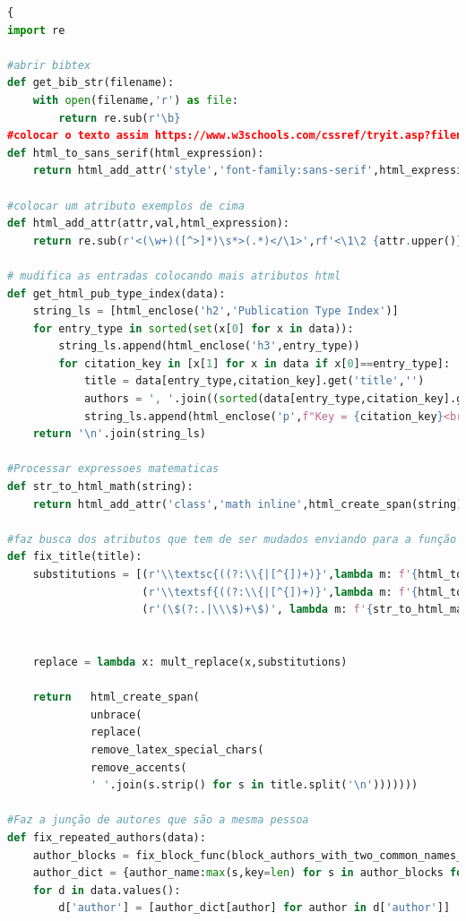 \documentclass[11pt,a4paper]{report}
\begin{document}
\begin{lstlisting}[language=python]{
import re

#abrir bibtex
def get_bib_str(filename):
    with open(filename,'r') as file:
        return re.sub(r'\b}
#colocar o texto assim https://www.w3schools.com/cssref/tryit.asp?filename=trycss_font-family
def html_to_sans_serif(html_expression):
    return html_add_attr('style','font-family:sans-serif',html_expression)

#colocar um atributo exemplos de cima
def html_add_attr(attr,val,html_expression):
    return re.sub(r'<(\w+)([^>]*)\s*>(.*)</\1>',rf'<\1\2 {attr.upper()}="{val}">\3</\1>',html_expression)

# mudifica as entradas colocando mais atributos html
def get_html_pub_type_index(data):
    string_ls = [html_enclose('h2','Publication Type Index')]
    for entry_type in sorted(set(x[0] for x in data)):
        string_ls.append(html_enclose('h3',entry_type))
        for citation_key in [x[1] for x in data if x[0]==entry_type]:
            title = data[entry_type,citation_key].get('title','')
            authors = ', '.join((sorted(data[entry_type,citation_key].get('author',''))))
            string_ls.append(html_enclose('p',f"Key = {citation_key}<br>Title = {fix_title(title)}<br>Autores = {authors}"))
    return '\n'.join(string_ls)

#Processar expressoes matematicas
def str_to_html_math(string):
    return html_add_attr('class','math inline',html_create_span(string))

#faz busca dos atributos que tem de ser mudados enviando para a função que as realiza
def fix_title(title):
    substitutions = [(r'\\textsc{((?:\\{|[^{])+)}',lambda m: f'{html_to_small_caps(html_create_span(m.group(1)))}'),
                     (r'\\textsf{((?:\\{|[^{])+)}',lambda m: f'{html_to_sans_serif(html_create_span(m.group(1)))}'),
                     (r'(\$(?:.|\\\$)+\$)', lambda m: f'{str_to_html_math(m.group(1))}')]


    replace = lambda x: mult_replace(x,substitutions)

    return   html_create_span(
             unbrace(
             replace(
             remove_latex_special_chars(
             remove_accents(
             ' '.join(s.strip() for s in title.split('\n')))))))

#Faz a junção de autores que são a mesma pessoa
def fix_repeated_authors(data):
    author_blocks = fix_block_func(block_authors_with_two_common_names_v2(get_author_list(data)))
    author_dict = {author_name:max(s,key=len) for s in author_blocks for author_name in s}
    for d in data.values():
        d['author'] = [author_dict[author] for author in d['author']]


\end{lstlisting}
\end{document}
